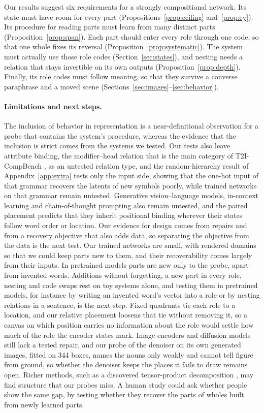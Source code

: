 \documentclass[10pt]{article}
\theoremstyle{plain}
\theoremstyle{remark}
\begin{document}
Our results suggest six requirements for a strongly compositional network. Its state must have room for every part (Propositions~\ref{prop:ceiling} and~\ref{prop:ey}). Its procedure for reading parts must learn from many distinct parts (Proposition~\ref{prop:span}). Each part should enter every role through one code, so that one whole fixes its reversal (Proposition~\ref{prop:systematic}). The system must actually use those role codes (Section~\ref{sec:states}), and nesting needs a relation that stays invertible on its own outputs (Proposition~\ref{prop:depth}). Finally, its role codes must follow meaning, so that they survive a converse paraphrase and a moved scene (Sections~\ref{sec:images}--\ref{sec:behavior}).

\paragraph{Limitations and next steps.} The inclusion of behavior in representation is a near-definitional observation for a probe that contains the system's procedure, whereas the evidence that the inclusion is strict comes from the systems we tested. Our tests also leave attribute binding, the modifier--head relation that is the main category of T2I-CompBench \citep{huang2023t2i,rassin2022}, as an untested relation type, and the random-hierarchy result of Appendix~\ref{app:extra} tests only the input side, showing that the one-hot input of that grammar recovers the latents of new symbols poorly, while trained networks on that grammar remain untested. Generative vision--language models, in-context learning and chain-of-thought prompting also remain untested, and the paired placement predicts that they inherit positional binding wherever their states follow word order or location. Our evidence for design comes from repairs and from a recovery objective that also adds data, so separating the objective from the data is the next test. Our trained networks are small, with rendered domains so that we could keep parts new to them, and their recoverability comes largely from their inputs. In pretrained models parts are new only to the probe, apart from invented words. Additions without forgetting, a new part in every role, nesting and code swaps rest on toy systems alone, and testing them in pretrained models, for instance by writing an invented word's vector into a role or by nesting relations in a sentence, is the next step. Fixed quadrants tie each role to a location, and our relative placement loosens that tie without removing it, so a canvas on which position carries no information about the role would settle how much of the role the encoder states mark. Image encoders and diffusion models still lack a tested repair, and our probe of the denoiser on its own generated images, fitted on 344 boxes, names the nouns only weakly and cannot tell figure from ground, so whether the denoiser keeps the places it fails to draw remains open. Richer methods, such as a discovered tensor-product decomposition \citep{mccoy2019}, may find structure that our probes miss. A human study could ask whether people show the same gap, by testing whether they recover the parts of wholes built from newly learned parts.
\end{document}
